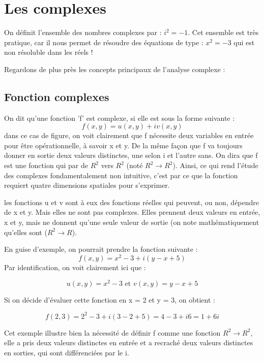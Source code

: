 \chapter{Les complexes}

On définit l'ensemble des nombres complexes par : $i^2 = -1$. Cet ensemble est très pratique, car il nous permet de résoudre des équations de type : $x^2 = -3$ qui est non résoluble dans les réels !

Regardons de plus près les concepts principaux de l'analyse complexe :

\section{Fonction complexes}

On dit qu'une fonction 'f' est complexe, si elle est sous la forme suivante : 
$$f(x,y)= u(x,y) + iv(x,y)$$
dans ce cas de figure, on voit clairement que f nécessite deux variables en entrée pour être opérationnelle, à savoir x et y. De la même façon que f va toujours donner en sortie deux valeurs distinctes, une selon i et l'autre sans. On dira que f est une fonction qui par de $R^2$ vers $R^2$ (noté $R^2 \rightarrow R^2$). Ainsi, ce qui rend l'étude des complexes fondamentalement non intuitive, c'est par ce que la fonction requiert quatre dimensions spatiales pour s'exprimer.

les fonctions u et v sont à eux des fonctions réelles qui peuvent, ou non, dépendre de x et y. Mais elles ne sont pas complexes. Elles prennent deux valeurs en entrée, x et y, mais ne donnent qu'une seule valeur de sortie (on note mathématiquement qu'elles sont ($R^2 \rightarrow R$).

En guise d'exemple, on pourrait prendre la fonction suivante : 
$$f(x,y) = x^2 - 3 + i(y - x + 5)$$
Par identification, on voit clairement ici que : 

$$u(x,y) = x^2 - 3 \text{    et   } v(x,y) = y - x + 5$$ 

Si on décide d'évaluer cette fonction en x = 2 et y = 3, on obtient :

$$f(2,3) = 2^2 - 3 +i(3 - 2 + 5) = 4 - 3 + i6 = 1 + 6i$$

Cet exemple illustre bien la nécessité de définir f comme une fonction $R^2 \rightarrow R^2$, elle a pris deux valeurs distinctes en entrée et a recraché deux valeurs distinctes en sorties, qui sont différenciées par le i.

